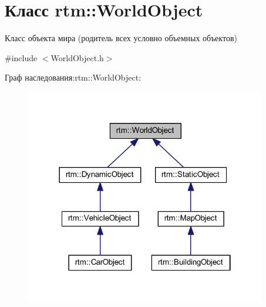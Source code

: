 \hypertarget{classrtm_1_1_world_object}{}\section{Класс rtm\+:\+:World\+Object}
\label{classrtm_1_1_world_object}


Класс объекта мира (родитель всех условно объемных объектов)  




{\ttfamily \#include $<$World\+Object.\+h$>$}



Граф наследования\+:rtm\+:\+:World\+Object\+:
\nopagebreak
\begin{figure}[H]
\begin{center}
\leavevmode
\includegraphics[width=298pt]{classrtm_1_1_world_object__inherit__graph}
\end{center}
\end{figure}
